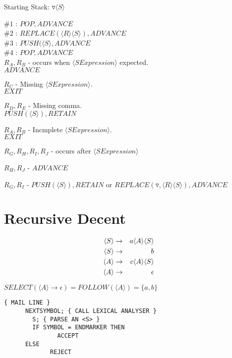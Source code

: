 \documentclass[a4paper,12pt]{article}
\newcommand{\nonterminal}[1]{\langle #1 \rangle}
\begin{document}
Starting Stack: $\triangledown \nonterminal{S}$

$\#1$ : $POP,ADVANCE$													\\
$\#2$ : $REPLACE(\nonterminal{R}\nonterminal{S}),ADVANCE$	\\
$\#3$ : $PUSH(\nonterminal{S},ADVANCE$								\\
$\#4$ : $POP,ADVANCE$													\\

$R_{A}, R_{B}$ - occurs when $\nonterminal{S Expression}$ expected. \\ $ADVANCE$

$R_{C}$ - Missing $\nonterminal{S Expression}$. \\ $EXIT$

$R_{D}, R_{E}$ - Missing comma. \\ $PUSH(\nonterminal{S}),RETAIN$

$R_{A}, R_{B}$ - Incmplete $\nonterminal{S Expression}$. \\ $EXIT$

$R_{G}, R_{H}, R_{I}, R_{J}$ - occurs after $\nonterminal{S Expression}$

$R_{H}, R_{J}$ - $ADVANCE$

$R_{G}, R_{I}$ - $PUSH(\nonterminal{S}),RETAIN$ or
$REPLACE(\triangledown,\nonterminal{R}\nonterminal{S}),ADVANCE$

\begin{table}[hbtp]


\end{table}

\section*{Recursive Decent}

\begin{eqnarray}
\setcounter{equation}{1}
\nonterminal{S}	&	\to	&	a \nonterminal{A} \nonterminal{S}	\\
\nonterminal{S}	&	\to	&	b 												\\
\nonterminal{A}	&	\to	&	c \nonterminal{A} \nonterminal{S}	\\
\nonterminal{A}	&	\to	&	\epsilon		
\end{eqnarray}

$SELECT(\nonterminal{A} \to \epsilon) = FOLLOW(\nonterminal{A}) = 
\{ a, b \}$

\begin{verbatim}
{ MAIL LINE }
      NEXTSYMBOL; { CALL LEXICAL ANALYSER }
		S; { PARSE AN <S> }
		IF SYMBOL = ENDMARKER THEN 
		       ACCEPT
      ELSE
             REJECT	
\end{verbatim}
\end{document}
